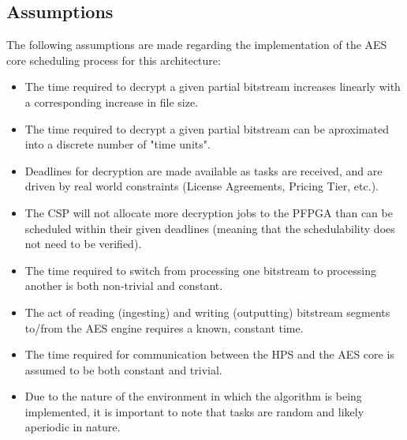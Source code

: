\subsection{Assumptions}\label{subsec:EDFAssumptions}
The following assumptions are made regarding the implementation of the AES core scheduling process for this architecture:
\begin{itemize}
    \item The time required to decrypt a given partial bitstream increases linearly with a corresponding increase in file size.
    \item The time required to decrypt a given partial bitstream can be aproximated into a discrete number of "time units".
    \item Deadlines for decryption are made available as tasks are received, and are driven by real world constraints (License Agreements, Pricing Tier, etc.).
    \item The CSP will not allocate more decryption jobs to the PFPGA than can be scheduled within their given deadlines (meaning that the schedulability does not need to be verified).
    \item The time required to switch from processing one bitstream to processing another is both non-trivial and constant.
    \item The act of reading (ingesting) and writing (outputting) bitstream segments to/from the AES engine requires a known, constant time.
    \item The time required for communication between the HPS and the AES core is assumed to be both constant and trivial.
    \item Due to the nature of the environment in which the algorithm is being implemented, it is important to note that tasks are random and likely aperiodic in nature.
\end{itemize}

